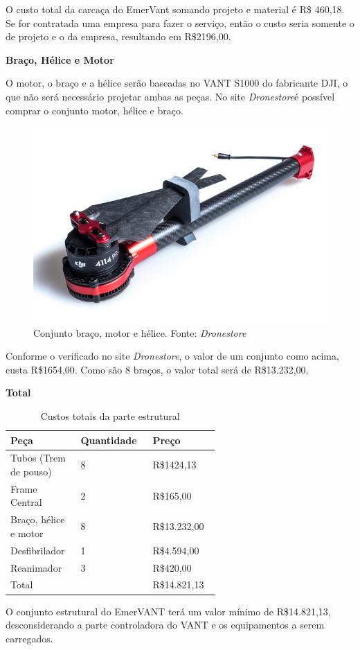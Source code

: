 O custo total da carcaça do EmerVant somando projeto e material é R\$ 460,18. Se for contratada uma empresa para fazer o serviço, então o custo seria somente o de projeto e o da empresa, resultando em R\$2196,00.


\indent \textbf{Braço, Hélice e Motor}

O motor, o braço e a hélice serão baseadas no VANT S1000 do fabricante DJI, o que
não será necessário projetar ambas as peças. No site \textit{Dronestore}\footnotemark é possível comprar o
conjunto motor, hélice e braço.


\begin{figure}[H]
    \centering
      \includegraphics[keepaspectratio=true,scale=0.4]{figuras/braco_helice.jpg}
    \caption{Conjunto braço, motor e hélice. Fonte: \textit{Dronestore}}
    \label{fig:braco_helice}
\end{figure}

Conforme o verificado no site \textit{Dronestore}, o valor de um conjunto como acima, custa
R\$1654,00. Como são 8 braços, o valor total será de R\$13.232,00.

\indent \textbf{Total}

\begin{table}[!h]
\centering
    \caption{Custos totais da parte estrutural}
\begin{tabular}{|p{0.20\linewidth}|p{0.20\linewidth}|p{0.20\linewidth}|}
\hline

Peça &Quantidade& Preço\\ \hline
Tubos (Trem de pouso)&8 &R\$1424,13\\ \hline
Frame Central &2 &R\$165,00\\ \hline
Braço, hélice e motor &8 &R\$13.232,00\\ \hline
Desfibrilador &1 &R\$4.594,00\\ \hline
Reanimador &3 &R\$420,00\\ \hline
Total& &R\$14.821,13\\ \hline
\end{tabular}
\end{table}

O conjunto estrutural do EmerVANT terá um valor mínimo de R\$14.821,13, desconsiderando a
parte controladora do VANT e os equipamentos a serem carregados.